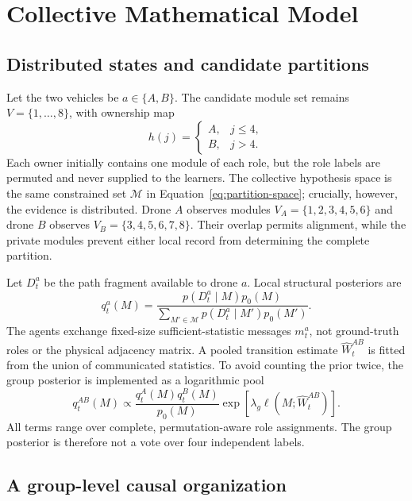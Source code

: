\documentclass[11pt,a4paper]{article}
\numberwithin{equation}{section}
\newcommand{\Mset}{\mathcal{M}}
\begin{document}
\section{Collective Mathematical Model}

\subsection{Distributed states and candidate partitions}

Let the two vehicles be $a\in\{A,B\}$. The candidate module set remains
$V=\{1,\ldots,8\}$, with ownership map
\begin{equation}
 h(j)=\begin{cases}A,&j\leq4,\\B,&j>4.\end{cases}
 \label{eq:ownership}
\end{equation}
Each owner initially contains one module of each role, but the role labels
are permuted and never supplied to the learners. The collective hypothesis
space is the same constrained set $\Mset$ in
Equation~\eqref{eq:partition-space}; crucially, however, the evidence is
distributed. Drone $A$ observes modules
$V_A=\{1,2,3,4,5,6\}$ and drone $B$ observes
$V_B=\{3,4,5,6,7,8\}$. Their overlap permits alignment, while the private
modules prevent either local record from determining the complete partition.

Let $D_t^a$ be the path fragment available to drone $a$. Local structural
posteriors are
\begin{equation}
 q_t^a(M)=\frac{p(D_t^a\mid M)p_0(M)}
 {\sum_{M'\in\Mset}p(D_t^a\mid M')p_0(M')}.
 \label{eq:local-posterior}
\end{equation}
The agents exchange fixed-size sufficient-statistic messages $m_t^a$, not
ground-truth roles or the physical adjacency matrix. A pooled transition
estimate $\widehat W_t^{AB}$ is fitted from the union of communicated
statistics. To avoid counting the prior twice, the group posterior is
implemented as a logarithmic pool
\begin{equation}
 q_t^{AB}(M)\propto
 \frac{q_t^A(M)q_t^B(M)}{p_0(M)}
 \exp\!\left[\lambda_g\ell(M;\widehat W_t^{AB})\right].
 \label{eq:pooled-posterior}
\end{equation}
All terms range over complete, permutation-aware role assignments. The group
posterior is therefore not a vote over four independent labels.

\subsection{A group-level causal organization}
\end{document}
